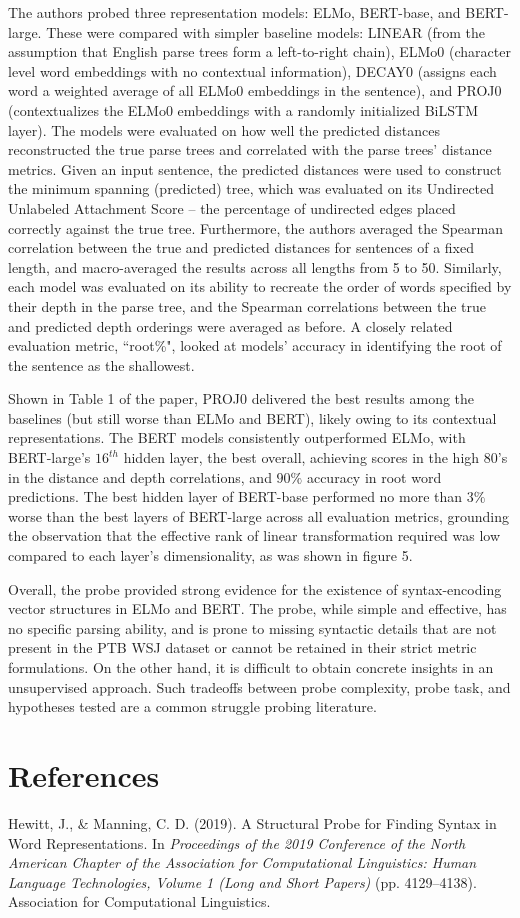 \documentclass[11pt]{article}
\begin{document}
The authors probed three representation models: 
ELMo, BERT-base, and BERT-large. 
These were compared with simpler baseline 
models: LINEAR (from the assumption
that English parse trees form a left-to-right
chain), ELMo0 (character level word embeddings with no contextual information), 
DECAY0 (assigns each word a weighted average
of all ELMo0 embeddings in the sentence), 
and PROJ0 (contextualizes the ELMo0 embeddings
with a randomly initialized BiLSTM layer).
The models were evaluated on how well the predicted
distances reconstructed the true parse trees 
and correlated with the parse trees’
distance metrics. Given an input sentence, the predicted distances
were used to construct the minimum spanning (predicted) tree, 
which was evaluated on its Undirected Unlabeled Attachment Score – 
the percentage of undirected edges placed correctly
against the true tree. Furthermore, the authors
averaged the Spearman correlation between 
the true and predicted distances for 
sentences of a fixed length,
and macro-averaged the results
across all lengths from 5 to 50.
Similarly, each model was evaluated
on its ability to recreate the order of words 
specified by their depth in the parse tree,
and the Spearman correlations between
the true and predicted depth orderings
were averaged as before. 
A closely related evaluation metric, ``root\%",
looked at models’ accuracy in identifying the 
root of the sentence as the shallowest.


Shown in Table 1 of the paper, 
PROJ0 delivered the best results among the baselines (but still worse than ELMo and BERT),
likely owing to its contextual representations.
The BERT models consistently outperformed ELMo, 
with BERT-large's $16^{th}$ hidden layer,
the best overall, achieving scores in the 
high $80$'s in the distance and depth correlations, 
and $90\%$ accuracy in root word predictions.
The best hidden layer of BERT-base
performed no more than $3\%$ worse than the best layers of BERT-large
across all evaluation metrics, grounding the observation that the 
effective rank of linear transformation required 
was low compared to each layer's dimensionality, as was shown in figure 5.

Overall, the probe provided strong evidence for the existence of
syntax-encoding vector structures in ELMo and BERT. The probe,
while simple and effective, has no specific parsing ability, and is prone 
to missing syntactic details that are not present in the PTB WSJ dataset or
cannot be retained in their strict metric formulations. On the other hand, it 
is difficult to obtain concrete insights in an unsupervised approach.
Such tradeoffs between probe complexity, probe task, and hypotheses tested
are a common struggle probing literature.


\section*{References}
Hewitt, J., \& Manning, C. D. (2019). A Structural Probe for Finding Syntax in Word Representations. In \textit{Proceedings of the 2019 Conference of the North American Chapter of the Association for Computational Linguistics: Human Language Technologies, Volume 1 (Long and Short Papers)} (pp. 4129–4138). Association for Computational Linguistics.
\end{document}
